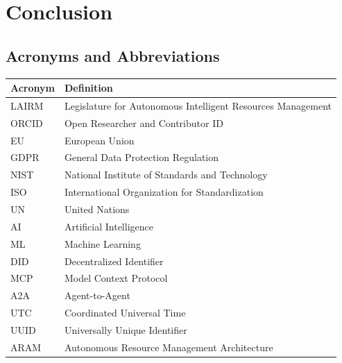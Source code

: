 \documentclass[12pt,a4paper,twoside,openright]{book}
\begin{document}
\part{Conclusion}






\appendix






\backmatter




\chapter*{Acronyms and Abbreviations}

\begin{tabularx}{\textwidth}{@{}lX@{}}
\toprule
\textbf{Acronym} & \textbf{Definition} \\
\midrule
LAIRM & Legislature for Autonomous Intelligent Resources Management \\
ORCID & Open Researcher and Contributor ID \\
EU & European Union \\
GDPR & General Data Protection Regulation \\
NIST & National Institute of Standards and Technology \\
ISO & International Organization for Standardization \\
UN & United Nations \\
AI & Artificial Intelligence \\
ML & Machine Learning \\
DID & Decentralized Identifier \\
MCP & Model Context Protocol \\
A2A & Agent-to-Agent \\
UTC & Coordinated Universal Time \\
UUID & Universally Unique Identifier \\
ARAM & Autonomous Resource Management Architecture \\
\bottomrule
\end{tabularx}

\cleardoublepage

\printbibliography[heading=bibintoc,title={References and Bibliography}]
\end{document}
